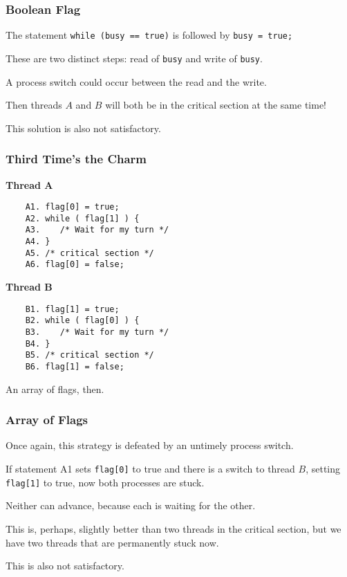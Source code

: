 \begin{frame}
\frametitle{Boolean Flag}

The statement \texttt{while (busy == true)} is followed by \texttt{busy = true;} 

These are two distinct steps: read of \texttt{busy} and write of \texttt{busy}.

A process switch could occur between the read and the write.

Then threads $A$ and $B$ will both be in the critical section at the same time! 

This solution is also not satisfactory.

\end{frame}

\begin{frame}[fragile]
\frametitle{Third Time's the Charm}

\begin{multicols}{2}
\textbf{Thread A}
	\begin{verbatim}
	A1. flag[0] = true;
	A2. while ( flag[1] ) {
	A3.    /* Wait for my turn */
	A4. }
	A5. /* critical section */
	A6. flag[0] = false;
	\end{verbatim}
\columnbreak
\textbf{Thread B}
	\begin{verbatim}
	B1. flag[1] = true;
	B2. while ( flag[0] ) {
	B3.    /* Wait for my turn */
	B4. }
	B5. /* critical section */
	B6. flag[1] = false;
	\end{verbatim}
\end{multicols}

An array of flags, then.
\end{frame}

\begin{frame}
\frametitle{Array of Flags}

Once again, this strategy is defeated by an untimely process switch. 

If statement A1 sets \texttt{flag[0]} to true and there is a switch to thread $B$, setting \texttt{flag[1]} to true, now both processes are stuck.

Neither can advance, because each is waiting for the other.

This is, perhaps, slightly better than two threads in the critical section, but we have two threads that are permanently stuck now. 

This is also not satisfactory.

\end{frame}


